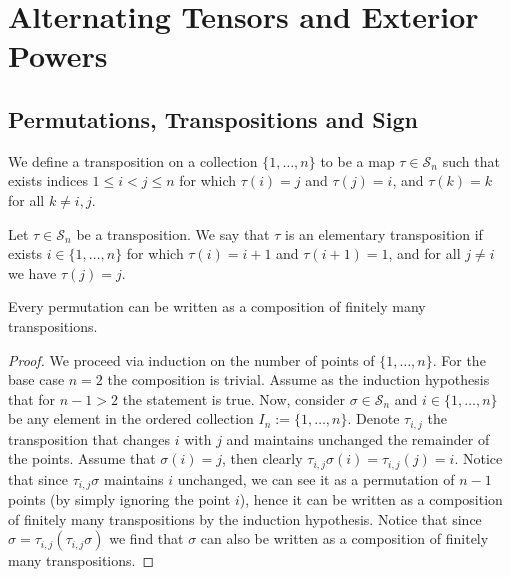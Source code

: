\section{Alternating Tensors and Exterior Powers}

\subsection{Permutations, Transpositions and Sign}

\begin{definition}[Transposition]
  \label{def: transposition}
  We define a transposition on a collection \(\{1, \dots, n\}\) to be a map
  \(\tau \in \mathcal S_n\) such that exists indices \(1 \leq i < j \leq n\)
  for which \(\tau(i) = j\) and \(\tau(j) = i\), and \(\tau(k) = k\) for all
  \(k \neq i, j\).
\end{definition}

\begin{definition}
  Let \(\tau \in \mathcal S_n\) be a transposition. We say that \(\tau\) is an
  elementary transposition if exists \(i \in \{1, \dots, n\}\) for which
  \(\tau(i) = i + 1\) and \(\tau(i + 1) = 1\), and for all \(j \neq i\) we have
  \(\tau(j) = j\).
\end{definition}

\begin{proposition}\label{prop: permutations to transpositions}
  Every permutation can be written as a composition of finitely many
  transpositions.
\end{proposition}

\begin{proof}
  We proceed via induction on the number of points of \(\{1, \dots, n\}\). For
  the base case \(n = 2\) the composition is trivial. Assume as the induction
  hypothesis that for \(n - 1 > 2\) the statement is true. Now, consider
  \(\sigma \in \mathcal S_n\) and \(i \in \{1, \dots, n\}\) be any element in
  the ordered collection \(I_n := \{1, \dots, n\}\). Denote \(\tau_{i, j}\) the
  transposition that changes \(i\) with \(j\) and maintains unchanged the
  remainder of the points. Assume that \(\sigma(i) = j\), then clearly
  \(\tau_{i, j} \sigma(i) = \tau_{i, j}(j) = i\). Notice that since \(\tau_{i,
  j} \sigma\) maintains \(i\) unchanged, we can see it as a permutation of \(n
  - 1\) points (by simply ignoring the point \(i\)), hence it can be written as
  a composition of finitely many transpositions by the induction hypothesis.
  Notice that since \(\sigma = \tau_{i, j} (\tau_{i, j} \sigma)\) we find that
  \(\sigma\) can also be written as a composition of finitely many
  transpositions.
\end{proof}

